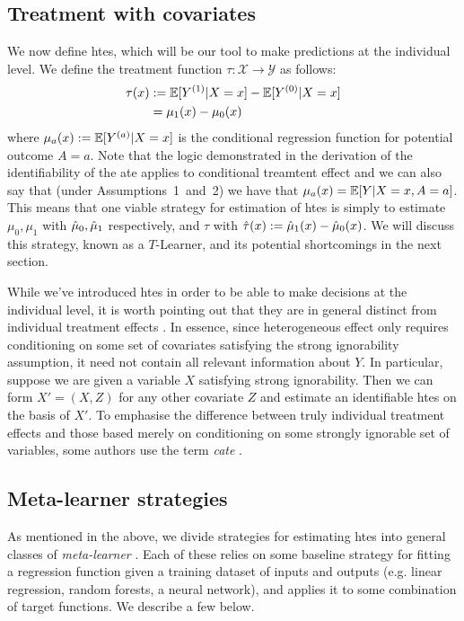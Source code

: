 \documentclass[../thesis.tex]{subfiles}
\begin{document}

\subsection{Treatment with covariates}
We now define \glspl{hte}, which will be our tool to make predictions at the individual level. We define the treatment function $\tau: \mathcal{X} \rightarrow \mathcal{Y}$ as follows:
\begin{align*}
    \tau(x) & := \mathbb{E}[Y^{(1)} | X =x] - \mathbb{E}[Y^{(0)} | X=x] \\
    & = \mu_1(x) - \mu_0(x) 
\end{align*}
where $\mu_a(x) := \mathbb{E}[Y^{(a)}|X=x]$ is the conditional regression function for potential outcome $A=a$. Note that the logic demonstrated in the derivation of the identifiability of the \gls{ate} applies to conditional treamtent effect and we can also say that (under Assumptions~1~and~2) we have that $\mu_a(x) = \mathbb{E}[Y|X=x,A=a]$. This means that one viable strategy for estimation of \glspl{hte} is simply to estimate $\mu_0,\mu_1$ with $\hat{\mu}_0, \hat{\mu}_1$ respectively, and $\tau$ with $\hat{\tau}(x) := \hat{\mu}_1(x) - \hat{\mu}_0(x)$. We will discuss this strategy, known as a $T$-Learner, and its potential shortcomings in the next section.

While we've introduced \glspl{hte} in order to be able to make decisions at the individual level, it is worth pointing out that they are in general distinct from individual treatment effects \citep{vegetabile_distinction_2021}. In essence, since heterogeneous effect only requires conditioning on some set of covariates satisfying the strong ignorability assumption, it need not contain all relevant information about $Y$. In particular, suppose we are given a variable $X$ satisfying strong ignorability. Then we can form $X'=(X,Z)$ for any other covariate $Z$ and estimate an identifiable \glspl{hte} on the basis of $X'$. To emphasise the difference between truly individual treatment effects and those based merely on conditioning on some strongly ignorable set of variables, some authors use the term \emph{\gls{cate}} \citep{vegetabile_distinction_2021}.

\subsection{Meta-learner strategies}
\label{sec:metalearners}
As mentioned in the above, we divide strategies for estimating \glspl{hte} into general classes of \emph{meta-learner} \citep{kunzel_metalearners_2019, curth_nonparametric_2021}. Each of these relies on some baseline strategy for fitting a regression function given a training dataset of inputs and outputs (e.g. linear regression, random forests, a neural network), and applies it to some combination of target functions. We describe a few below.
\end{document}
